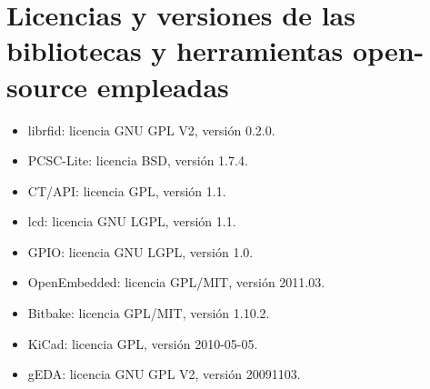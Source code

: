 \section{Licencias y versiones de las bibliotecas y herramientas open-source empleadas}

\begin{itemize}
\item librfid: licencia GNU GPL V2, versión 0.2.0.
\item PCSC-Lite: licencia BSD, versión 1.7.4.
\item CT/API: licencia GPL, versión 1.1.
\item lcd: licencia GNU LGPL, versión 1.1.
\item GPIO: licencia GNU LGPL, versión 1.0.
\item OpenEmbedded: licencia GPL/MIT, versión 2011.03.
\item Bitbake: licencia GPL/MIT, versión 1.10.2.
\item KiCad: licencia GPL, versión 2010-05-05.
\item gEDA: licencia GNU GPL V2, versión 20091103.
\end{itemize}